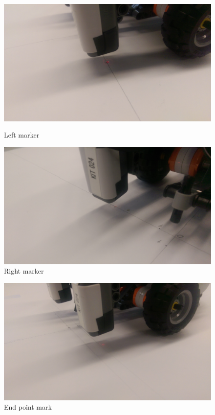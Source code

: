\documentclass[paper=a4, fontsize=11pt]{scrartcl} %
\begin{document}
    \begin{figure}[!tbp]
        \centering
        \begin{minipage}[b]{0.9\textwidth}
            \includegraphics[width=1\linewidth]{images/IMAG0142}
            \caption{Left marker}
            \label{fig:img3}
        \end{minipage}
        \hfill
        \begin{minipage}[b]{0.9\textwidth}
            \includegraphics[width=1\linewidth]{images/IMAG0141}
            \caption{Right marker}
            \label{fig:img4}
        \end{minipage}
    \end{figure}

    \begin{figure}
        \centering
        \includegraphics[width=0.9\linewidth]{images/IMAG0139}
        \caption{End point mark}
        \label{fig:img5}
    \end{figure}
\end{document}
